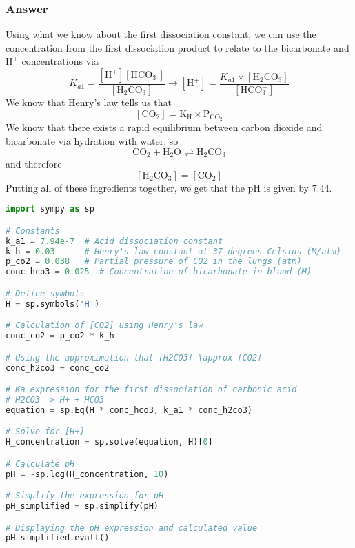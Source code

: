 \documentclass[12pt]{article}
\begin{document}
\subsubsection{Answer}
Using what we know about the first dissociation constant, we can use the concentration from the first dissociation product to relate to the bicarbonate and $\mathrm{H}^{+}$ concentrations via
\begin{equation}
K_{a 1}=\frac{\left[\mathrm{H}^{+}\right]\left[\mathrm{HCO}_{3}^{-}\right]}{\left[\mathrm{H}_{2} \mathrm{CO}_{3}\right]} \rightarrow \left[\mathrm{H}^{+}\right]=\frac{K_{a 1} \times\left[\mathrm{H_2CO_3}\right]}{\left[\mathrm{HCO}_{3}^{-}\right]}
\end{equation}
We know that Henry's law tells us that 
\begin{equation}
\left[\mathrm{CO}_{2}\right]=\mathrm{K}_{\mathrm{H}} \times \mathrm{P}_{\mathrm{CO}_{2}}
\end{equation}
We know that there exists a rapid equilibrium between carbon dioxide and bicarbonate via hydration with water, so
\begin{equation}
\mathrm{CO}_{2}+\mathrm{H}_{2} \mathrm{O} \rightleftharpoons \mathrm{H}_{2} \mathrm{CO}_{3}
\end{equation}
and therefore
\begin{equation}
\left[\mathrm{H}_{2} \mathrm{CO}_{3}\right]=\left[\mathrm{CO}_{2}\right]
\end{equation}
Putting all of these ingredients together, we get that the $\mathrm{pH}$ is given by $7.44$.
\begin{lstlisting}[language=Python]
import sympy as sp

# Constants
k_a1 = 7.94e-7  # Acid dissociation constant
k_h = 0.03      # Henry's law constant at 37 degrees Celsius (M/atm)
p_co2 = 0.038   # Partial pressure of CO2 in the lungs (atm)
conc_hco3 = 0.025  # Concentration of bicarbonate in blood (M)

# Define symbols
H = sp.symbols('H')

# Calculation of [CO2] using Henry's law
conc_co2 = p_co2 * k_h

# Using the approximation that [H2CO3] \approx [CO2]
conc_h2co3 = conc_co2

# Ka expression for the first dissociation of carbonic acid
# H2CO3 -> H+ + HCO3-
equation = sp.Eq(H * conc_hco3, k_a1 * conc_h2co3)

# Solve for [H+]
H_concentration = sp.solve(equation, H)[0]

# Calculate pH
pH = -sp.log(H_concentration, 10)

# Simplify the expression for pH
pH_simplified = sp.simplify(pH)

# Displaying the pH expression and calculated value
pH_simplified.evalf()


\end{lstlisting}
\end{document}
